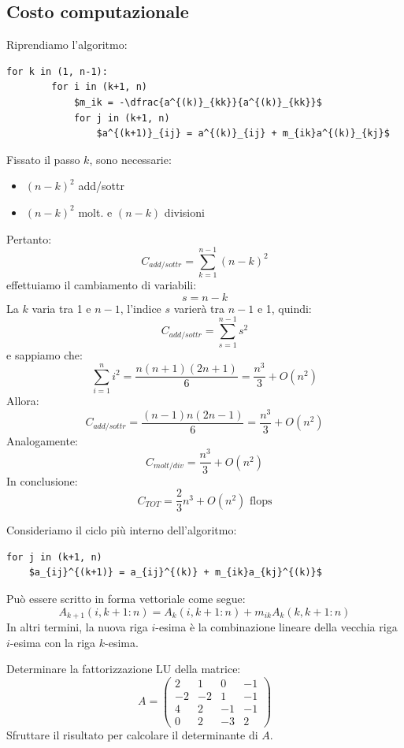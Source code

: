\documentclass[12pt]{report}
\begin{document}
\subsection{Costo computazionale}
Riprendiamo l'algoritmo:
\begin{lstlisting}[style=pseudocode, mathescape=true]
	for k in (1, n-1):
		for i in (k+1, n)
			$m_ik = -\dfrac{a^{(k)}_{kk}}{a^{(k)}_{kk}}$
			for j in (k+1, n)
				$a^{(k+1)}_{ij} = a^{(k)}_{ij} + m_{ik}a^{(k)}_{kj}$
\end{lstlisting}
Fissato il passo $k$, sono necessarie:
\begin{itemize}
	\item $(n-k)^2$ add/sottr
	\item $(n-k)^2$ molt. e  $(n-k)$ divisioni
\end{itemize}
Pertanto:
\[
C_{add/sottr} = \sum_{k=1}^{n-1}(n-k)^2
\]
effettuiamo il cambiamento di variabili:
\[
s = n - k
\]
La $k$ varia tra 1 e $n-1$, l'indice $s$ varierà tra $n-1$ e 1, quindi:
\[
C_{add/sottr} = \sum_{s=1}^{n-1}s^2
\]
e sappiamo che:
\[
\sum_{i=1}^{n}i^2 = \dfrac{n(n+1)(2n+1)}{6} = \dfrac{n^3}{3} + O(n^2)
\]
Allora:
\[
C_{add/sottr} = \dfrac{(n-1)n(2n-1)}{6}=\dfrac{n^3}{3} + O(n^2)
\]
Analogamente:
\[
C_{molt/div} = \dfrac{n^3}{3} + O(n^2)
\]
In conclusione:
\[
C_{TOT} = \frac{2}{3}n^3 + O(n^2) \text{ flops}
\]
\begin{note}{}{}
Consideriamo il ciclo più interno dell'algoritmo:
\begin{lstlisting}[style=pseudocode, mathescape=true]
for j in (k+1, n)
	$a_{ij}^{(k+1)} = a_{ij}^{(k)} + m_{ik}a_{kj}^{(k)}$
\end{lstlisting}
Può essere scritto in forma vettoriale come segue:
\[
A_{k+1}(i, k+1: n) = A_k(i, k+1:n) + m_{ik}A_k(k, k+1:n)
\]
In altri termini, la nuova riga $i$-esima è la combinazione lineare della vecchia riga $i$-esima con la riga $k$-esima.
\end{note}
\begin{assignment}{}{}
Determinare la fattorizzazione LU della matrice:
\[
A = \begin{pmatrix}
	2 & 1 & 0 & -1 \\
	-2 & -2 & 1 & -1 \\
	4 & 2 & -1 & -1 \\
	0 & 2 & -3 & 2
\end{pmatrix}
\]
Sfruttare il risultato per calcolare il determinante di $A$.
\end{assignment}
\end{document}

